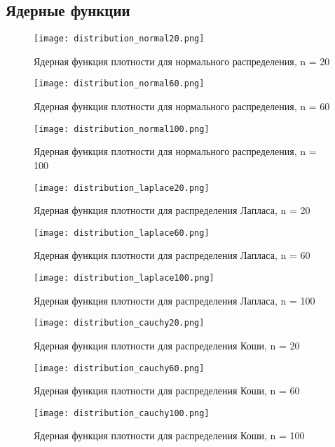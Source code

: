 \documentclass[a4]{article}
\begin{document}
\subsection{Ядерные функции}

\begin{center}
    \begin{figure}[H]
 \caption{Ядерная функция плотности для нормального распределения, n = 20}
\texttt{[image: distribution\_normal20.png]}
\end{figure}
    \begin{figure}[H]
 \caption{Ядерная функция плотности для нормального распределения, n = 60}
\texttt{[image: distribution\_normal60.png]}
\end{figure}
    \begin{figure}[H]
 \caption{Ядерная функция плотности для нормального распределения, n = 100}
\texttt{[image: distribution\_normal100.png]}
\end{figure}

    \begin{figure}[H]
 \caption{Ядерная функция плотности для распределения Лапласа, n = 20}
\texttt{[image: distribution\_laplace20.png]}
\end{figure}
    \begin{figure}[H]
 \caption{Ядерная функция плотности для распределения Лапласа, n = 60}
\texttt{[image: distribution\_laplace60.png]}
\end{figure}
    \begin{figure}[H]
 \caption{Ядерная функция плотности для распределения Лапласа, n = 100}
\texttt{[image: distribution\_laplace100.png]}
\end{figure}

    \begin{figure}[H]
 \caption{Ядерная функция плотности для распределения Коши, n = 20}
\texttt{[image: distribution\_cauchy20.png]}
\end{figure}
    \begin{figure}[H]
 \caption{Ядерная функция плотности для распределения Коши, n = 60}
\texttt{[image: distribution\_cauchy60.png]}
\end{figure}
    \begin{figure}[H]
 \caption{Ядерная функция плотности для распределения Коши, n = 100}
\texttt{[image: distribution\_cauchy100.png]}
\end{figure}


\end{center}
\end{document}

